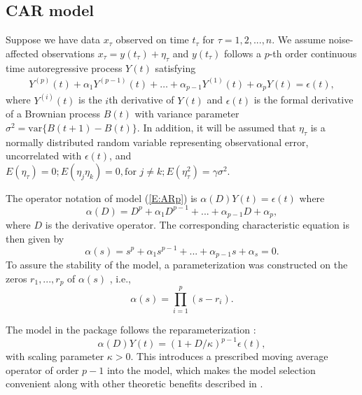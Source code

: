 

\subsection{CAR model}
Suppose we have data $x_{\tau}$ observed on time $t_{\tau}$ for $\tau=1,2, ...,n$. We assume noise-affected observations $x_{\tau}=y(t_{\tau})+\eta_{\tau}$ and $y(t_{\tau})$ follows a $p$-th order continuous time autoregressive process $Y(t)$ satisfying
\begin{align}\label{E:ARp}
     Y^{(p)}(t)+\alpha_1Y^{(p-1)}(t)+\ldots+\alpha_{p-1}Y^{(1)}(t)+\alpha_pY(t)=\epsilon(t),
\end{align}
where $Y^{(i)}(t)$ is the $i$th derivative of $Y(t)$ and $\epsilon(t)$ is the formal derivative of a Brownian process $B(t)$ with variance parameter $\sigma^2 = \textrm{var}\{B(t +1) - B(t)\}$.
In addition, it will be assumed that $\eta_{\tau}$ is a normally distributed random variable representing observational error, uncorrelated with $\epsilon(t)$, and $
E(\eta_\tau) =0;
E(\eta_j \eta_k) =0, \mbox{for } j\neq k; 
E(\eta_\tau^2) =\gamma\sigma^2.$

The operator notation of model (\ref{E:ARp}) is $\alpha(D)Y(t)=\epsilon(t)$ where
\begin{equation}
\alpha(D)=D^p+\alpha_1 D^{p-1}+...+\alpha_{p-1} D+\alpha_{p},
\end{equation}
where $D$ is the derivative operator. The corresponding characteristic equation is then given by
\begin{equation}
\alpha(s)=s^p+\alpha_1 s^{p-1}+...+\alpha_{p-1} s+\alpha_{s}=0.
\end{equation}
To assure the stability of the model, a parameterization 
was constructed on the zeros $r_1,...,r_p$ of $\alpha(s)$ \citep{Jone:1981}, i.e., 
\begin{equation}\label{E:carfac}
\alpha(s)=\prod_{i=1}^{p}(s-r_i).
\end{equation}


The model in the  package follows the reparameterization \citep{Belc:Hamp:Tunn:1994}:
\begin{equation}\label{E:belc1}
\alpha(D)Y(t)=(1+D/\kappa)^{p-1}\epsilon(t),
\end{equation}
with scaling parameter $\kappa>0$. This introduces a prescribed moving average operator of order $p-1$ into the model, which makes the model selection convenient along with other theoretic benefits described in \citet{Belc:Hamp:Tunn:1994}. 

